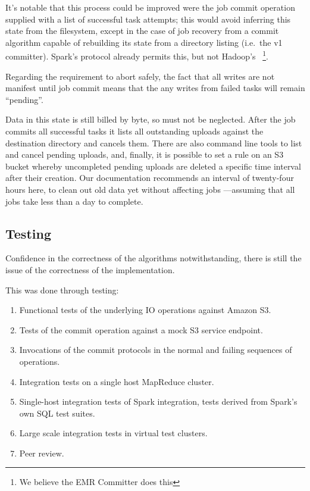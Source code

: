 \documentclass[conference]{IEEEtran}
\begin{document}
It's notable that this process could be improved were the job commit
operation supplied with a list of successful task attempts;
this would avoid inferring this state from the filesystem, except in
the case of job recovery from a commit algorithm capable of
rebuilding its state from a directory listing (i.e.\ the v1 committer).
Spark's protocol already permits this, but not Hadoop's
\ \footnote{We believe the EMR Committer does this}.

Regarding the requirement to abort safely, the fact that all writes are
not manifest until job commit means that the any writes from failed tasks
will remain ``pending''.

Data in this state is still billed by byte, so must not be neglected.
After the job commits all successful tasks it lists all outstanding
uploads against the destination directory and cancels them.
There are also command line tools to list and cancel pending uploads,
and, finally, it is possible to set a rule on an S3 bucket whereby uncompleted
pending uploads are deleted a specific time interval after their creation.
Our documentation recommends an interval of twenty-four hours here, to
clean out old data yet without affecting jobs ---assuming that all jobs
take less than a day to complete.


\subsection{Testing}
\label{subsec:testing}

Confidence in the correctness of the algorithms notwithstanding, there
is still the issue of the correctness of the implementation.


This was done through testing:

\begin{enumerate}
  \item Functional tests of the underlying IO operations against Amazon S3.
  \item Tests of the commit operation against a mock S3 service endpoint.
  \item Invocations of the commit protocols in the normal and failing sequences of operations.
  \item Integration tests on a single host MapReduce cluster.
  \item Single-host integration tests of Spark integration, tests derived from Spark's own SQL test suites.
  \item Large scale integration tests in virtual test clusters.
  \item Peer review.
\end{enumerate}
\end{document}
